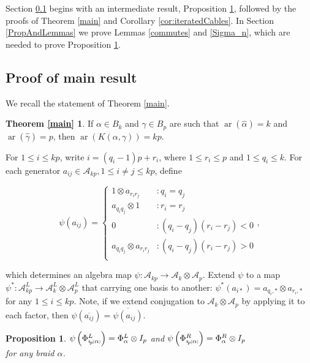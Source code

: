 \documentclass[11pt]{amsart}
\def\A{{\mathcal A}}
\def\ar{\operatorname{ar}}
\newcommand*{\subsmallp}[1]{\scalebox{.5}{\ensuremath#1}}
\newcommand{\subpp}[2][p]{\imath_{\hspace*{-1pt}#1}\hspace*{-.5pt}\subsmallp(#2\subsmallp)}
\newtheorem{prop}[thm]{Proposition}
\theoremstyle{definition}
\begin{document}
Section \ref{MainProof} begins with an intermediate result, Proposition \ref{psiofbp}, followed by the proofs of Theorem \ref{main} and Corollary \ref{cor:iteratedCables}.  In Section \ref{PropAndLemmas} we prove Lemmas \ref{commutes} and \ref{Sigma_n}, which are needed to prove Proposition \ref{psiofbp}.

\subsection{Proof of main result}
\label{MainProof}
We recall the statement of Theorem \ref{main}.

\newtheorem*{main}{Theorem \ref{main}}
\begin{main}
If $\alpha\in B_k$ and $\gamma\in B_p$ are such that $\ar(\hat{\alpha})=k$ and $\ar(\hat{\gamma})=p$, then $\ar(K(\alpha,\gamma))=kp$.
\end{main}

For $1\le i\le kp$, write $i = (q_i-1)p + r_i$, where $1\le r_i \le p$ and $1\le q_i\le k$.  For each generator $a_{ij}\in\A_{kp}, 1\le i\ne j\le kp$, define

\begin{equation}
\psi(a_{ij}) =
  \begin{cases}
         1\otimes a_{r_ir_j} & \colon q_i = q_j\\
         a_{q_iq_j}\otimes 1 & \colon r_i = r_j\\
         0 & \colon (q_i-q_j)(r_i-r_j)<0\\
         a_{q_iq_j}\otimes a_{r_ir_j} & \colon (q_i-q_j)(r_i-r_j)>0\\
  \end{cases},
  \label{defn:psi}
\end{equation}

\noindent which determines an algebra map $\psi\colon \A_{kp} \rightarrow \A_k\otimes \A_p$. Extend $\psi$ to a map $\psi^\ast:\A_{kp}^L\to\A_k^L\otimes\A_p^L$ that carrying one basis to another: $\psi^\ast(a_{i\ast}) = a_{q_i,\ast}\otimes a_{r_i,\ast}$ for any $1\le i\le kp$. Note, if we extend conjugation to $\A_k\otimes\A_p$ by applying it to each factor, then $\psi(\overline{a_{ij}}) = \overline{\psi(a_{ij})}$.

\begin{prop}\label{psiofbp}
$\psi\left(\Phi_{\subpp\alpha}^L\right) = \Phi_\alpha^L\otimes I_p$ and $\psi\left(\Phi_{\subpp\alpha}^R\right) = \Phi_\alpha^R\otimes I_p$\\
for any braid $\alpha$.
\end{prop}
\end{document}
